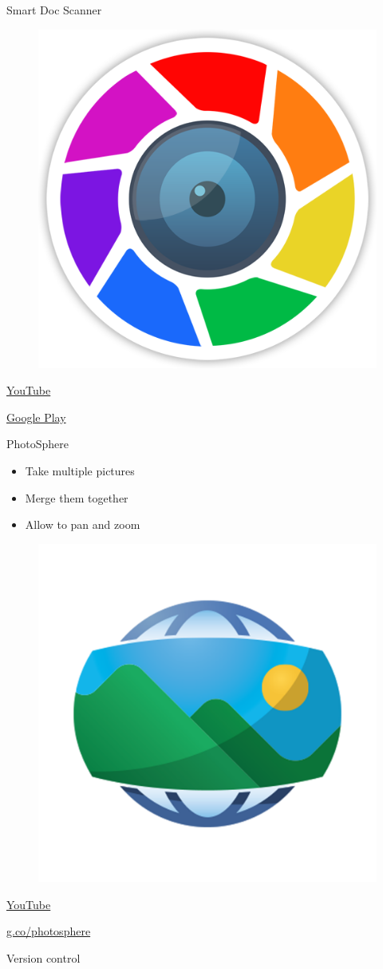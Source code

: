 \documentclass[serif,14pt,color=usenames,dvipsnames]{beamer}
\begin{document}
\begin{frame}{Smart Doc Scanner}
  \centering

  \begin{figure}
  \includegraphics[width=0.3\linewidth]{imgs/sds}
  \end{figure}

  \href{https://www.youtube.com/watch?v=zAcMvZpTeBo}{YouTube }

  \href{https://play.google.com/store/apps/details?id=com.mobilicy.docscanner}{Google
  Play }
\end{frame}

\begin{frame}{PhotoSphere}

  \begin{itemize}
    \item Take multiple pictures
    \item Merge them together
    \item Allow to pan and zoom
  \end{itemize}

  \centering

  \begin{figure}
  \includegraphics[width=0.3\linewidth]{imgs/photosphere}
  \end{figure}

  \href{https://www.youtube.com/watch?v=NPs3eIiWRaw}{YouTube }

  \href{https://g.co/photosphere}{g.co/photosphere }

\end{frame}

\begin{frame}{Version control}

\end{frame}
\end{document}
